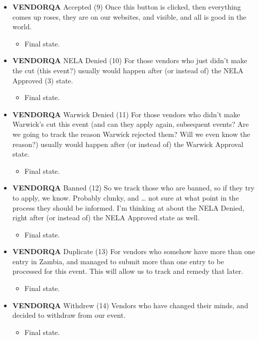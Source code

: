 \documentclass[captions=tablesignature]{scrartcl}
\begin{document}
\begin{itemize}
\item {\bfseries\sffamily VENDORQA} Accepted (9)
\label{sec-3-1-5-8}
Once this button is clicked, then everything comes up roses, they
are on our websites, and visible, and all is good in the world.
\begin{itemize}
\item Final state.
\end{itemize}

\item {\bfseries\sffamily VENDORQA} NELA Denied (10)
\label{sec-3-1-5-9}
For those vendors who just didn't make the cut (this event?)
usually would happen after (or instead of) the NELA Approved (3)
state.
\begin{itemize}
\item Final state.
\end{itemize}

\item {\bfseries\sffamily VENDORQA} Warwick Denied (11)
\label{sec-3-1-5-10}
For those vendors who didn't make Warwick's cut this event (and
can they apply again, subsequent events?  Are we going to track
the reason Warwick rejected them?  Will we even know the reason?)
usually would happen after (or instead of) the Warwick Approval
state.
\begin{itemize}
\item Final state.
\end{itemize}

\item {\bfseries\sffamily VENDORQA} Banned (12)
\label{sec-3-1-5-11}
So we track those who are banned, so if they try to apply, we
know.  Probably clunky, and \ldots{} not sure at what point in the
process they should be informed.  I'm thinking at about the NELA
Denied, right after (or instead of) the NELA Approved state as
well.
\begin{itemize}
\item Final state.
\end{itemize}

\item {\bfseries\sffamily VENDORQA} Duplicate (13)
\label{sec-3-1-5-12}
For vendors who somehow have more than one entry in Zambia, and
managed to submit more than one entry to be processed for this
event.  This will allow us to track and remedy that later.
\begin{itemize}
\item Final state.
\end{itemize}

\item {\bfseries\sffamily VENDORQA} Withdrew (14)
\label{sec-3-1-5-13}
Vendors who have changed their minds, and decided to withdraw
from our event.
\begin{itemize}
\item Final state.
\end{itemize}


\end{itemize}
\end{document}
